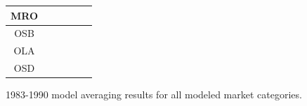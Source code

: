 \documentclass[12pt]{article}
\begin{document}
\begin{landscape}
\begin{figure}
\begin{minipage}[c]{0.3\textwidth}
\begin{tabular}{|c|c|c|c|c|c|}
        MRO&\cellcolor[HTML]{4DAF4A}&\cellcolor[HTML]{4DAF4A}&\cellcolor[HTML]{4DAF4A}&\cellcolor[HTML]{4DAF4A}&\cellcolor[HTML]{4DAF4A}\\ \hline %
        OSB&\cellcolor[HTML]{984EA3}&\cellcolor[HTML]{984EA3}&\cellcolor[HTML]{984EA3}&\cellcolor[HTML]{984EA3}&\cellcolor[HTML]{984EA3}\\ \hline %
        OLA&\cellcolor[HTML]{984EA3}&\cellcolor[HTML]{984EA3}&\cellcolor[HTML]{984EA3}&\cellcolor[HTML]{984EA3}&\cellcolor[HTML]{984EA3}\\ \hline %
        OSD&\cellcolor[HTML]{984EA3}&\cellcolor[HTML]{984EA3}&\cellcolor[HTML]{984EA3}&\cellcolor[HTML]{984EA3}&\cellcolor[HTML]{984EA3}\\ \hline %
\end{tabular}
\end{minipage}
\caption{1983-1990 model averaging results for all modeled market categories.}
\label{colorTabApp83}
\end{figure}
\end{landscape}

%
\clearpage
%
\end{document}
